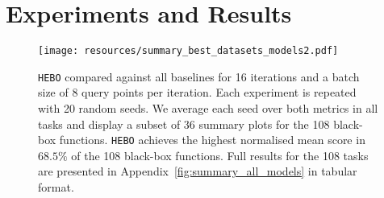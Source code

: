 \documentclass[jair,twoside,11pt,theapa]{article}
\theoremstyle{definition}
\begin{document}
\section{Experiments and Results 
}\label{Sec:Exp}

   \begin{figure}[t]
    \centering
\texttt{[image: resources/summary\_best\_datasets\_models2.pdf]}
\caption{\texttt{HEBO} compared against all baselines for 16 iterations and a batch size of 8 query points per iteration. Each experiment is repeated with 20 random seeds. We average each seed over both metrics in all tasks and display a subset of 36 summary plots for the 108 black-box functions. \texttt{HEBO} achieves the highest normalised mean score in $68.5\%$ of the 108 black-box functions. Full results for the 108 tasks are presented in Appendix~\ref{fig:summary_all_models} in tabular format.}
\label{fig:best_models_datasets}
    \end{figure}
\end{document}
